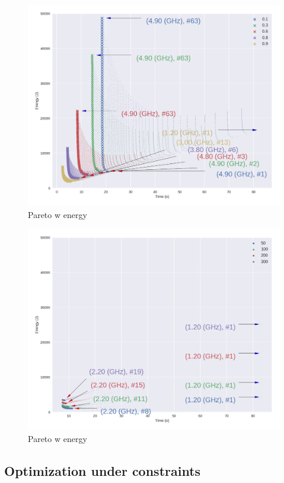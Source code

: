 \begin{figure}
	\centering
	\includegraphics[width=\columnwidth]{models/figures/analisys/pareto_w_high.png}
	\caption{Pareto w energy}
	\label{fig:pareto_w_h}
\end{figure}

\begin{figure}
	\centering
	\includegraphics[width=\columnwidth]{models/figures/analisys/pareto_static_low.png}
	\caption{Pareto w energy}
	\label{fig:pareto_w_l}
\end{figure}

\subsection{Optimization under constraints}

